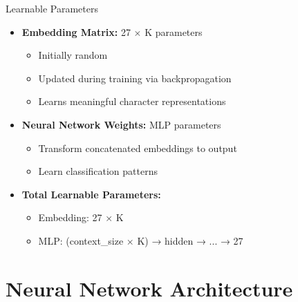 \documentclass[usenames,dvipsnames]{beamer}
\begin{document}
\begin{frame}{Learnable Parameters}
\begin{itemize}
\item \textbf{Embedding Matrix:} 27 × K parameters
\begin{itemize}
\item Initially random
\pause
\item Updated during training via backpropagation
\item Learns meaningful character representations
\end{itemize}

\item \textbf{Neural Network Weights:} MLP parameters
\begin{itemize}
\item Transform concatenated embeddings to output
\item Learn classification patterns
\end{itemize}

\item \textbf{Total Learnable Parameters:}
\begin{itemize}
\item Embedding: 27 × K
\item MLP: (context\_size × K) → hidden → ... → 27
\end{itemize}
\end{itemize}
\end{frame}

\section{Neural Network Architecture}
\end{document}
